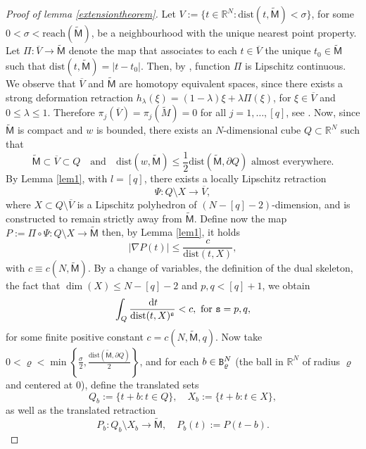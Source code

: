 \documentclass[a4paper]{amsart}
\theoremstyle{plain}  %
\numberwithin{equation}{section}
\def\dt{\,{\rm d}t}
\newcommand{\R}{\mathbb{R}}
\newcommand{\mm}{\mathsf{M}}
\newcommand{\rr}{\varrho}
\newcommand{\tx}[1]{\textnormal{\texttt{#1}}}
\begin{document}
\begin{proof}[Proof of lemma \ref{extensiontheorem}]
Let
$ V:= \{t \in \R^N: \text{dist}(t,\tilde{\mm}) < \sigma \}$, for some $0<\sigma < \text{reach}(\tilde{\mm})$, 
be a neighbourhood with the unique nearest point property.
Let \( \Pi : \overline{V} \to \tilde{\mm} \) denote the map that associates to each $t \in \overline{V}$ the unique $t_0 \in \tilde{\mm}$ such that $\text{dist}(t,\tilde{\mm})=|t-t_0|$. Then, by \cite[Theorem 2.4]{H}, function $\Pi$ is Lipschitz continuous. We observe that $\overline{V}$ and $\tilde{\mm}$ are homotopy equivalent spaces, since there exists a strong deformation retraction $h_\lambda(\xi)=(1-\lambda)\xi + \lambda\Pi(\xi)$, for $\xi \in \overline{V}$ and $0\leq \lambda\leq  1$. Therefore $\pi_j(\overline{V})=\pi_j(\tilde{M})=0$ for all $j =1,\dots,[q]$, see \cite[Proposition 1.17]{ha}. Now, since \( \tilde{\mm} \) is compact and \( w \) is bounded, there exists an \( N \)-dimensional cube \( Q \subset \mathbb{R}^N \) such that
\[
\tilde{\mm} \subset \overline{V} \subset Q \quad \text{and} \quad \text{dist}(w,\tilde{\mm}) \leq \frac{1}{2}\text{dist}(\tilde{\mm},\partial Q) \text{  almost everywhere}. 
\]
By Lemma \ref{lem1}, with \( l = [q] \), there exists a locally Lipschitz retraction
\[
\Psi : Q \setminus X \to \overline{V},
\]
where \( X \subset Q \setminus \overline{V} \) is a Lipschitz polyhedron of $(N - [q]-2)$-dimension, and is constructed to remain strictly away from \( \tilde{\mm} \). Define now the map \( P := \Pi \circ \Psi: Q \setminus X \to \tilde{\mm} \) then, by Lemma \ref{lem1}, it holds
\begin{equation}\label{(3.4)Notes}
|\nabla P(t)| \leq \frac{c}{\text{dist}(t, X)},
\end{equation}
with \( c \equiv c(N, \tilde{\mm}) \). By a change of variables, the definition of the dual skeleton, the fact that \( \dim(X) \leq N - [q] - 2 \) and $p,q < [q]+1$, we obtain
\begin{equation}\label{(3.5)Notes}
\int_Q \frac{\dt}{\text{dist}(t, X)^\tx{s}} < c, \ \text{for } \tx{s}={p,q},
\end{equation}
for some finite positive constant \( c = c(N, \tilde{\mm}, q) \). Now take \( 0 < \rr < \min\left\{ \frac{\sigma}{2}, \frac{\text{dist}(\tilde{\mm}, \partial Q)}{2} \right\} \), and for each \( b \in \tx{B}_\rr^N \) (the ball in $\R^N$ of radius $\rr$ and centered at $0$), define the translated sets
\[
Q_b := \{ t + b : t \in Q \}, \quad X_b := \{ t + b : t \in X \},
\]
as well as the translated retraction
\[
P_b : Q_b \setminus X_b \to \tilde{\mm}, \quad P_b(t) := P(t - b).
\]
\end{proof}
\end{document}
